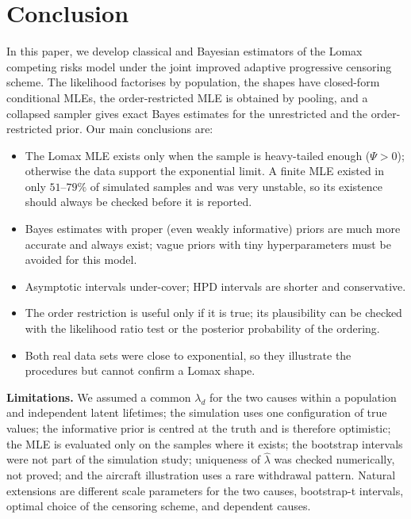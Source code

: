 \documentclass[a4paper,11pt]{article}
\begin{document}
\section{Conclusion}\label{sec6}
In this paper, we develop classical and Bayesian estimators of the Lomax competing risks model under the joint improved adaptive progressive censoring scheme. The likelihood factorises by population, the shapes have closed-form conditional MLEs, the order-restricted MLE is obtained by pooling, and a collapsed sampler gives exact Bayes estimates for the unrestricted and the order-restricted prior. Our main conclusions are:
\begin{itemize}
\item The Lomax MLE exists only when the sample is heavy-tailed enough ($\Psi>0$); otherwise the data support the exponential limit. A finite MLE existed in only $51$--$79\%$ of simulated samples and was very unstable, so its existence should always be checked before it is reported.
\item Bayes estimates with proper (even weakly informative) priors are much more accurate and always exist; vague priors with tiny hyperparameters must be avoided for this model.
\item Asymptotic intervals under-cover; HPD intervals are shorter and conservative.
\item The order restriction is useful only if it is true; its plausibility can be checked with the likelihood ratio test or the posterior probability of the ordering.
\item Both real data sets were close to exponential, so they illustrate the procedures but cannot confirm a Lomax shape.
\end{itemize}
\textbf{Limitations.} We assumed a common $\lambda_d$ for the two causes within a population and independent latent lifetimes; the simulation uses one configuration of true values; the informative prior is centred at the truth and is therefore optimistic; the MLE is evaluated only on the samples where it exists; the bootstrap intervals were not part of the simulation study; uniqueness of $\hat\lambda$ was checked numerically, not proved; and the aircraft illustration uses a rare withdrawal pattern. Natural extensions are different scale parameters for the two causes, bootstrap-t intervals, optimal choice of the censoring scheme, and dependent causes.

\appendix
\end{document}
